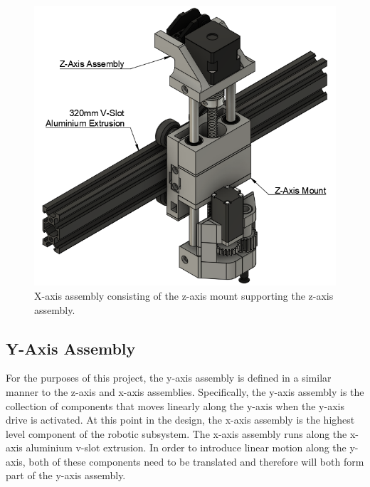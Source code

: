 \begin{figure}[H]
	\centering
	\includegraphics[width=0.8\linewidth]{figures/202108/x-axis-assembly.png}
	\caption{X-axis assembly consisting of the z-axis mount supporting the z-axis assembly.}
	\label{fig:x-axis-assembly}
\end{figure}

\subsection{Y-Axis Assembly}

For the purposes of this project, the y-axis assembly is defined in a similar manner to the z-axis and x-axis assemblies. Specifically, the y-axis assembly is the collection of components that moves linearly along the y-axis when the y-axis drive is activated. At this point in the design, the x-axis assembly is the highest level component of the robotic subsystem. The x-axis assembly runs along the x-axis aluminium v-slot extrusion. In order to introduce linear motion along the y-axis, both of these components need to be translated and therefore will both form part of the y-axis assembly.

